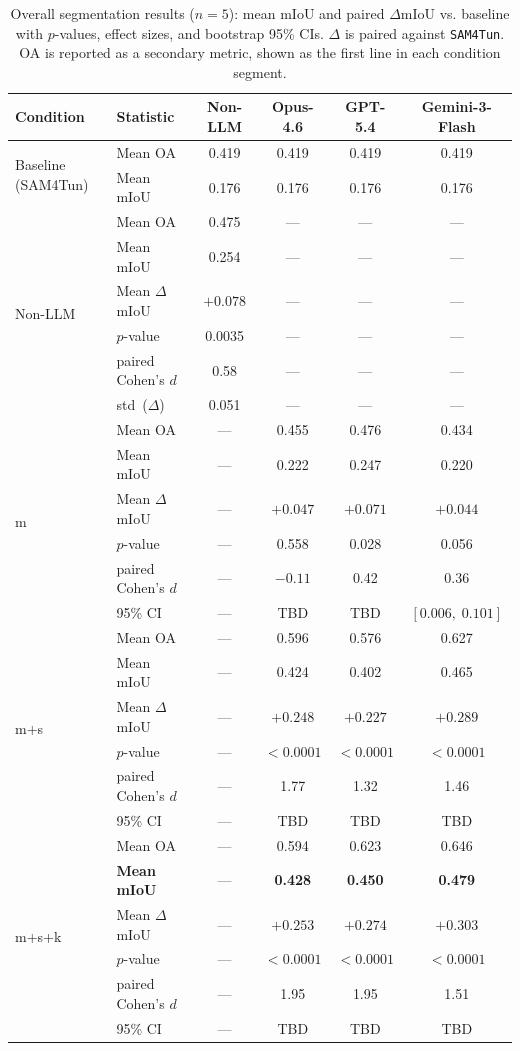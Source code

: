 \documentclass[a4paper,fleqn]{cas-dc}
\begin{document}
{\begin{table}[t]
\caption{Overall segmentation results ($n=5$): mean mIoU and paired $\Delta$mIoU vs. baseline with $p$-values, effect sizes, and bootstrap 95\% CIs. $\Delta$ is paired against \mbox{\texttt{SAM4Tun}}. OA is reported as a secondary metric, shown as the first line in each condition segment.}\label{tab:main-results}
\begin{tabular*}{\textwidth}{@{\extracolsep{\fill}} l l c c c c @{}}
\toprule
Condition & Statistic & Non-LLM & Opus-4.6 & GPT-5.4 & Gemini-3-Flash \\
\midrule
\multirow{2}{*}{Baseline (SAM4Tun)}
  & Mean OA & 0.419 & 0.419 & 0.419 & 0.419 \\
  & Mean mIoU & 0.176 & 0.176 & 0.176 & 0.176 \\
\midrule
\multirow{6}{*}{Non-LLM}
  & Mean OA & 0.475 & --- & --- & --- \\
  & Mean mIoU & 0.254 & --- & --- & --- \\
  & Mean $\Delta$mIoU & $+0.078$ & --- & --- & --- \\
  & $p$-value & 0.0035 & --- & --- & --- \\
  & paired Cohen's \mbox{$d$} & 0.58 & --- & --- & --- \\
  & std~($\Delta$) & 0.051 & --- & --- & --- \\
\midrule
\multirow{6}{*}{m}
  & Mean OA & --- & 0.455 & 0.476 & 0.434 \\
  & Mean mIoU & --- & 0.222 & 0.247 & 0.220 \\
  & Mean $\Delta$mIoU & --- & $+0.047$ & $+0.071$ & $+0.044$ \\
  & $p$-value & --- & 0.558 & 0.028 & 0.056 \\
  & paired Cohen's \mbox{$d$} & --- & $-0.11$ & 0.42 & 0.36 \\
  & 95\% CI & --- & TBD & TBD & $[0.006,\; 0.101]$ \\
\midrule
\multirow{6}{*}{m+s}
  & Mean OA & --- & 0.596 & 0.576 & 0.627 \\
  & Mean mIoU & --- & 0.424 & 0.402 & 0.465 \\
  & Mean $\Delta$mIoU & --- & $+0.248$ & $+0.227$ & $+0.289$ \\
  & $p$-value & --- & $<0.0001$ & $<0.0001$ & $<0.0001$ \\
  & paired Cohen's \mbox{$d$} & --- & 1.77 & 1.32 & 1.46 \\
  & 95\% CI & --- & TBD & TBD & TBD \\
\midrule
\multirow{6}{*}{m+s+k}
  & Mean OA & --- & 0.594 & 0.623 & 0.646 \\
  & \textbf{Mean mIoU} & --- & \textbf{0.428} & \textbf{0.450} & \textbf{0.479} \\
  & Mean $\Delta$mIoU & --- & $+0.253$ & $+0.274$ & $+0.303$ \\
  & $p$-value & --- & $<0.0001$ & $<0.0001$ & $<0.0001$ \\
  & paired Cohen's \mbox{$d$} & --- & 1.95 & 1.95 & 1.51 \\
  & 95\% CI & --- & TBD & TBD & TBD \\
\bottomrule
\end{tabular*}
\end{table}



}
\end{document}
